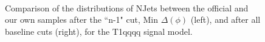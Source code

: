 \begin{figure}
        \centering
        \hspace{-1 cm}
        ~ %
        \caption{Comparison of the distributions of NJets between the official and our own samples after the ``n-1" cut, Min $\Delta(\phi)$ (left), and after all baseline cuts (right), for the T1qqqq signal model.}\label{fig:animals}
\end{figure}        
        
